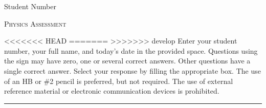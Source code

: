 \documentclass[
    11pt,
    fleqn,
]{scrartcl}
\newlength{\mylen}
\begin{document}
%
%
%
%
%
%



%

%
%

\begin{examcopy}[2]

\setlength{\mylen}{\linewidth}
\addtolength{\mylen}{-17em}
\begin{minipage}{\linewidth}
    \centering
    \begin{minipage}{15.5em}
        \centering
        Student Number \\
    \end{minipage}
    \begin{minipage}{\mylen}
        \centering
        \textsc{Physics Assessment} \\
    \end{minipage}
\end{minipage}

\null\hfill\parbox[c]{0.9\linewidth}{\small
<<<<<<< HEAD
=======
>>>>>>> develop
    Enter your student number, your full name, and today's date in the provided space.
    Questions using the sign \multiSymbole{} may have zero, one or several correct answers.
    Other questions have a single correct answer.
    Select your response by filling the appropriate box.
    The use of an HB or \#2 pencil is preferred, but not required.
    The use of external reference material or electronic communication devices is prohibited.
}\hfill\null

\rule[0pt]{\linewidth}{0.5pt}


\end{examcopy}
\end{document}
